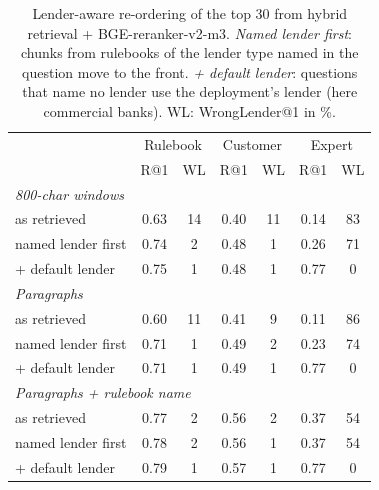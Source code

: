 \begin{table}[t]\centering\small\setlength{\tabcolsep}{2.5pt}
\begin{tabular}{lcccccc}\toprule
& \multicolumn{2}{c}{Rulebook} & \multicolumn{2}{c}{Customer} & \multicolumn{2}{c}{Expert}\\
& R@1 & WL & R@1 & WL & R@1 & WL\\\midrule
\multicolumn{7}{l}{\textit{800-char windows}}\\
\quad as retrieved & 0.63 & 14 & 0.40 & 11 & 0.14 & 83\\
\quad named lender first & 0.74 & 2 & 0.48 & 1 & 0.26 & 71\\
\quad + default lender & 0.75 & 1 & 0.48 & 1 & 0.77 & 0\\
\midrule
\multicolumn{7}{l}{\textit{Paragraphs}}\\
\quad as retrieved & 0.60 & 11 & 0.41 & 9 & 0.11 & 86\\
\quad named lender first & 0.71 & 1 & 0.49 & 2 & 0.23 & 74\\
\quad + default lender & 0.71 & 1 & 0.49 & 1 & 0.77 & 0\\
\midrule
\multicolumn{7}{l}{\textit{Paragraphs + rulebook name}}\\
\quad as retrieved & 0.77 & 2 & 0.56 & 2 & 0.37 & 54\\
\quad named lender first & 0.78 & 2 & 0.56 & 1 & 0.37 & 54\\
\quad + default lender & 0.79 & 1 & 0.57 & 1 & 0.77 & 0\\
\bottomrule\end{tabular}
\caption{Lender-aware re-ordering of the top 30 from hybrid retrieval + BGE-reranker-v2-m3. \emph{Named lender first}: chunks from rulebooks of the lender type named in the question move to the front. \emph{+ default lender}: questions that name no lender use the deployment's lender (here commercial banks). WL: WrongLender@1 in \%.}\label{tab:lender}
\end{table}
